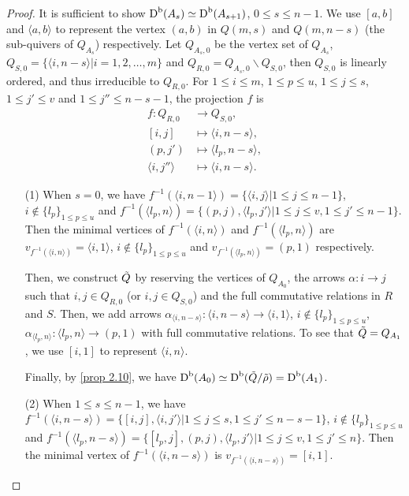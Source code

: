 \documentclass[a4paper, reqno]{amsart}
\theoremstyle{definition}
\theoremstyle{remark}
\numberwithin{equation}{section}
\begin{document}
\begin{proof}
    It is sufficient to show $\textup{D}^{\textup{b}}(A_s) \simeq \textup{D}^{\textup{b}}(A_{s+1})$, $0 \leq s \leq n-1$. We use $[a,b]$ and $\langle a,b \rangle $ to represent the vertex $(a,b)$ in $Q(m,s) $ and $Q(m,n-s)$ (the sub-quivers of $ Q_{A_s}$) respectively. Let $Q_{A_s,0}$ be the vertex set of $Q_{A_s}$,  $ Q_{S,0} = \{\langle i,n-s \rangle | i=1,2,\dots,m \}$ and $Q_{R,0} = Q_{A_s,0}\backslash Q_{S,0}$, then $Q_{S,0}$ is linearly ordered, and thus irreducible to $Q_{R,0} $. For $1\leq i\leq m $, $ 1\leq p \leq u $, $ 1\leq j \leq s $, $ 1\leq j' \leq v $ and $ 1\leq j'' \leq n-s-1 $, the projection $f$ is
    \begin{align*}
        f: Q_{R,0} &\to Q_{S,0},\\
        [i,j] &\mapsto \langle i, n-s \rangle, \\
        (p,j') &\mapsto \langle l_p, n-s \rangle, \\
        \langle i,j'' \rangle &\mapsto \langle i, n-s \rangle.
    \end{align*}
\begin{itemize}
\item[(1)] When $s = 0$, we have $f^{-1}(\langle i,n-1\rangle) = \{ \langle i,j \rangle| 1\leq j \leq n-1\}$, $i\notin \{l_p\}_{1\leq p \leq u} $ and $f^{-1}(\langle l_p,n\rangle) = \{ (p,j),\langle l_p,j'\rangle| 1\leq j \leq v, 1\leq j' \leq n-1 \} $. Then the minimal vertices of $f^{-1}(\langle i,n\rangle)$ and $f^{-1}(\langle l_p,n\rangle)$ are $ v_{f^{-1}(\langle i,n\rangle)} = \langle i,1\rangle$, $i\notin \{l_p\}_{1\leq p \leq u}$  and $ v_{f^{-1}(\langle l_p,n\rangle)} = (p,1)$ respectively. 

Then, we construct $ \Tilde{Q}$ by reserving the vertices of $Q_{A_{0}}$, the arrows $ \alpha: i\to j$ such that $ i,j \in Q_{R,0}$ (or $i,j \in Q_{S,0}$) and the full commutative relations in $R$ and $S$. Then, we add arrows $ \alpha_{\langle i,n-s \rangle}: \langle i,n-s \rangle \to \langle i,1 \rangle$, $i\notin \{l_p\}_{1\leq p \leq u}$, $ \alpha_{\langle l_p,n \rangle}: \langle l_p,n \rangle \to (p,1)$ with full commutative relations. To see that $\Tilde{Q} = Q_{A_{1}}$, we use $ [i,1]$ to represent $\langle i, n\rangle $. 

Finally, by \ref{prop 2.10}, we have $\textup{D}^{\textup{b}}(A_0) \simeq \textup{D}^{\textup{b}}(\Tilde{Q}/\Tilde{\rho}) =\textup{D}^{\textup{b}}(A_1) $.

\item[(2)] When $1 \leq s\leq n-1$, we have $f^{-1}(\langle i,n-s\rangle) = \{ [i,j], \langle i,j' \rangle| 1\leq j \leq s, 1\leq j' \leq n-s-1\}$, $i\notin \{l_p\}_{1\leq p \leq u} $ and $f^{-1}(\langle l_p,n-s\rangle) = \{ [l_p,j],(p,j),\langle l_p,j'\rangle| 1\leq j \leq v, 1\leq j' \leq n \} $. Then the minimal vertex of $f^{-1}(\langle i,n-s\rangle)$ is $ v_{f^{-1}(\langle i,n-s\rangle)} = [i,1]$. 


\end{itemize}
\end{proof}
\end{document}
